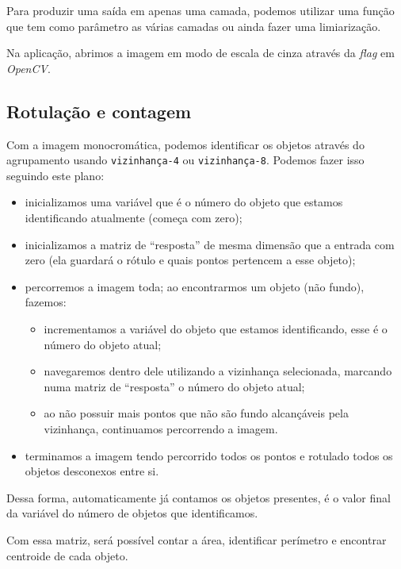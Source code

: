 \documentclass[brazilian,a4paper,twocolumn]{article}
\begin{document}
        Para produzir uma saída em apenas uma camada, podemos utilizar uma função que tem como parâmetro as várias camadas ou ainda fazer uma limiarização.

        Na aplicação, abrimos a imagem em modo de escala de cinza através da \textit{flag} em \emph{OpenCV}.

    \subsection{Rotulação e contagem}
    \label{sec:metodo-rotulacao}

        Com a imagem monocromática, podemos identificar os objetos através do agrupamento usando \texttt{vizinhança-4} ou \texttt{vizinhança-8}. Podemos fazer isso seguindo este plano:
        \begin{itemize}
            \item inicializamos uma variável que é o número do objeto que estamos identificando atualmente (começa com zero);
            \item inicializamos a matriz de ``resposta'' de mesma dimensão que a entrada com zero (ela guardará o rótulo e quais pontos pertencem a esse objeto);
            \item percorremos a imagem toda; ao encontrarmos um objeto (não fundo), fazemos:
            \begin{itemize}
                \item incrementamos a variável do objeto que estamos identificando, esse é o número do objeto atual;
                \item navegaremos dentro dele utilizando a vizinhança selecionada, marcando numa matriz de ``resposta'' o número do objeto atual;
                \item ao não possuir mais pontos que não são fundo alcançáveis pela vizinhança, continuamos percorrendo a imagem.
            \end{itemize}
            \item terminamos a imagem tendo percorrido todos os pontos e rotulado todos os objetos desconexos entre si.
        \end{itemize}

        Dessa forma, automaticamente já contamos os objetos presentes, é o valor final da variável do número de objetos que identificamos.

        Com essa matriz, será possível contar a área, identificar perímetro e encontrar centroide de cada objeto.
\end{document}
